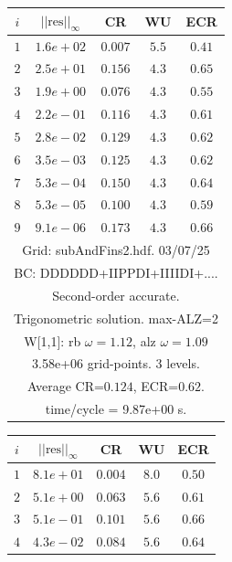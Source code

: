 \begin{table}[hbt]
\begin{center}
{\tablefontsize
\begin{tabular}{|c|c|c|c|c|} \hline 
 $i$   & $\vert\vert\mbox{res}\vert\vert_\infty$  &  CR     &  WU    & ECR  \\   \hline 
 $ 1$  & $ 1.6e+02$ & $0.007$ & $ 5.5$ & $0.41$ \\ 
 $ 2$  & $ 2.5e+01$ & $0.156$ & $ 4.3$ & $0.65$ \\ 
 $ 3$  & $ 1.9e+00$ & $0.076$ & $ 4.3$ & $0.55$ \\ 
 $ 4$  & $ 2.2e-01$ & $0.116$ & $ 4.3$ & $0.61$ \\ 
 $ 5$  & $ 2.8e-02$ & $0.129$ & $ 4.3$ & $0.62$ \\ 
 $ 6$  & $ 3.5e-03$ & $0.125$ & $ 4.3$ & $0.62$ \\ 
 $ 7$  & $ 5.3e-04$ & $0.150$ & $ 4.3$ & $0.64$ \\ 
 $ 8$  & $ 5.3e-05$ & $0.100$ & $ 4.3$ & $0.59$ \\ 
 $ 9$  & $ 9.1e-06$ & $0.173$ & $ 4.3$ & $0.66$ \\ 
\hline 
\multicolumn{5}{|c|}{Grid: subAndFins2.hdf. 03/07/25}  \\
\multicolumn{5}{|c|}{BC: DDDDDD+IIPPDI+IIIIDI+....}  \\
\multicolumn{5}{|c|}{Second-order accurate.}  \\
\multicolumn{5}{|c|}{Trigonometric solution. max-ALZ=2}  \\
\multicolumn{5}{|c|}{W[1,1]: rb $\omega=1.12$, alz $\omega=1.09$}  \\
\multicolumn{5}{|c|}{3.58e+06 grid-points. 3 levels.}  \\
\multicolumn{5}{|c|}{Average CR=$0.124$, ECR=$0.62$.}  \\
\multicolumn{5}{|c|}{time/cycle = 9.87e+00 s.}  \\
\hline 
\end{tabular}
\begin{tabular}{|c|c|c|c|c|} \hline 
 $i$   & $\vert\vert\mbox{res}\vert\vert_\infty$  &  CR     &  WU    & ECR  \\   \hline 
 $ 1$  & $ 8.1e+01$ & $0.004$ & $ 8.0$ & $0.50$ \\ 
 $ 2$  & $ 5.1e+00$ & $0.063$ & $ 5.6$ & $0.61$ \\ 
 $ 3$  & $ 5.1e-01$ & $0.101$ & $ 5.6$ & $0.66$ \\ 
 $ 4$  & $ 4.3e-02$ & $0.084$ & $ 5.6$ & $0.64$ \\ 

\end{tabular}}
\end{center}
\end{table}

